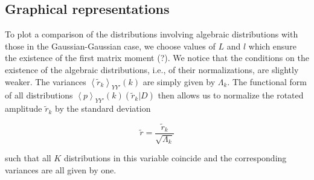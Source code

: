 \subsection{Graphical representations}\label{subsec:graphical_distributions}

To plot a comparison of the distributions involving algebraic distributions
with those in the Gaussian-Gaussian case, we choose values of $L$ and $l$ which
ensure the existence of the first matrix moment (?). We notice that the
conditions on the existence of the algebraic distributions, i.e., of their
normalizations, are slightly weaker. The variances $\left\langle \tilde{r}_{k} \right\rangle_{YY'}{\left(k\right)}$
are simply given by $\Lambda_{k}$. The functional form of all distributions
$\left\langle p \right\rangle_{YY'}{\left(k\right)} \left(\tilde{r}_{k} \vert D \right)$
then allows us to normalize the rotated amplitude $\tilde{r}_k$ by the standard
deviation

\begin{equation}
    \tilde{r} = \frac{\tilde{r}_{k}}{\sqrt{\Lambda_{k}}}
\end{equation}

such that all $K$ distributions in this variable coincide and the corresponding
variances are all given by one.